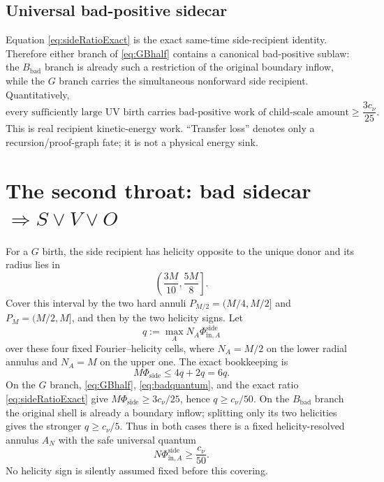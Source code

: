\documentclass[11pt]{article}
\begin{document}
\subsection{Universal bad-positive sidecar}

Equation \eqref{eq:sideRatioExact} is the exact same-time side-recipient identity.  Therefore either branch of \eqref{eq:GBhalf} contains a canonical bad-positive sublaw: the $B_{\mathrm{bad}}$ branch is already such a restriction of the original boundary inflow, while the $G$ branch carries the simultaneous nonforward side recipient.  Quantitatively,
\begin{equation}\label{eq:badquantum}
\boxed{
\text{every sufficiently large UV birth carries bad-positive work of child-scale amount}
\ge\frac{3c_\nu}{25}.
}
\end{equation}
This is real recipient kinetic-energy work.  ``Transfer loss'' denotes only a recursion/proof-graph fate; it is not a physical energy sink.

\section{The second throat: bad sidecar $\Rightarrow S\vee V\vee O$}

For a $G$ birth, the side recipient has helicity opposite to the unique donor and its radius lies in
\[
\left(\frac{3M}{10},\frac{5M}{8}\right].
\]
Cover this interval by the two hard annuli $P_{M/2}=(M/4,M/2]$ and $P_M=(M/2,M]$, and then by the two helicity signs.  Let
\[
q:=\max_A N_A\Phi_{\mathrm{in},A}^{\mathrm{side}}
\]
over these four fixed Fourier--helicity cells, where $N_A=M/2$ on the lower radial annulus and $N_A=M$ on the upper one.  The exact bookkeeping is
\[
M\Phi_{\mathrm{side}}
\le 4q+2q=6q.
\]
On the $G$ branch, \eqref{eq:GBhalf}, \eqref{eq:badquantum}, and the exact ratio \eqref{eq:sideRatioExact} give $M\Phi_{\mathrm{side}}\ge3c_\nu/25$, hence $q\ge c_\nu/50$.  On the $B_{\mathrm{bad}}$ branch the original shell is already a boundary inflow; splitting only its two helicities gives the stronger $q\ge c_\nu/5$.  Thus in both cases there is a fixed helicity-resolved annulus $A_N$ with the safe universal quantum
\begin{equation}\label{eq:sidecarIn}
\boxed{
N\Phi_{\mathrm{in},A}^{\mathrm{side}}
\ge\frac{c_\nu}{50}.
}
\end{equation}
No helicity sign is silently assumed fixed before this covering.
\end{document}
